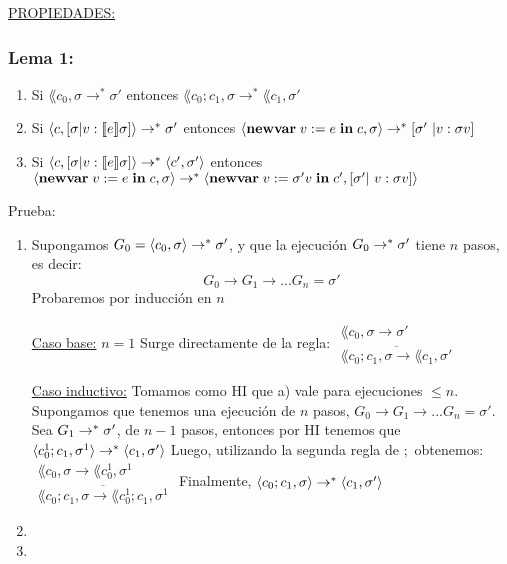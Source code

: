     \PN \underline{PROPIEDADES:}
    \subsubsection*{\textbf{Lema 1:}}
      \begin{enumerate}
        \item Si $\lang{c_0, \sigma} \rightarrow^{\ast} \sigma'$ entonces $\lang{c_0;c_1, \sigma} \rightarrow^{\ast} \lang{c_1, \sigma'}$
        \item Si $\langle c, [\sigma | v : \llbracket e\rrbracket \sigma]\rangle \rightarrow^{\ast} \sigma'$ entonces $\lang{\newvar{v := e}{c}, \sigma} \rightarrow^{\ast} [\sigma' | v : \sigma v]$
        \item Si $\langle c, [\sigma | v : \llbracket e\rrbracket \sigma]\rangle \rightarrow^{\ast} \langle c', \sigma'\rangle$ entonces $\lang{\newvar{v := e}{c}, \sigma} \rightarrow^{\ast} \lang{\newvar{v := \sigma' v}{c'}, [\sigma' | v : \sigma v]}$
      \end{enumerate}
      \PN Prueba:
      \begin{enumerate}
        \item Supongamos $G_0 = \langle c_0, \sigma\rangle \rightarrow^{\ast} \sigma'$, y que la ejecución $G_0 \rightarrow^{\ast} \sigma'$ tiene $n$ pasos, es decir:
        \[
          G_0 \rightarrow G_1 \rightarrow ... G_n = \sigma'
        \]
        \PN Probaremos por inducción en $n$

        \underline{Caso base:} $n = 1$ Surge directamente de la regla:
        $\begin{array}{cll}
          \lang{c_0, \sigma} \rightarrow \sigma' \\
          \overline{\lang{c_0;c_1, \sigma} \rightarrow \lang{c_1, \sigma'}}
        \end{array}$

        \underline{Caso inductivo:} Tomamos como HI que a) vale para ejecuciones $\leq n$.
        \PN Supongamos que tenemos una ejecución de $n$ pasos, $G_0 \rightarrow G_1 \rightarrow ... G_n = \sigma'$.
        \PN Sea $G_1 \rightarrow^{\ast} \sigma'$, de $n-1$ pasos, entonces por HI tenemos que $\langle c_{0}^{1};c_1, \sigma^{1}\rangle \rightarrow^{\ast} \langle c_1, \sigma'\rangle$
        \PN Luego, utilizando la segunda regla de $;$ obtenemos:
        $\begin{array}{cll}
          \lang{c_0, \sigma} \rightarrow \lang{c_{0}^{1}, \sigma^{1}} \\
          \overline{\lang{c_0;c_1, \sigma} \rightarrow \lang{c_{0}^{1}; c_1, \sigma^{1}}}
        \end{array}$
        \PN Finalmente, $\langle c_0;c_1, \sigma\rangle \rightarrow^{\ast} \langle c_1, \sigma'\rangle$

        \item
        \item
      \end{enumerate}

